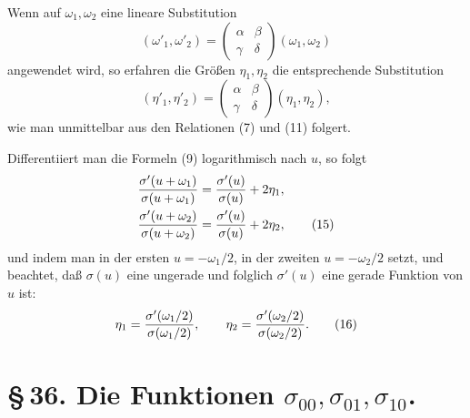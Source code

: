 \documentclass[11pt]{article}
\begin{document}
Wenn auf $\omega_1,
\omega_2$ eine lineare Substitution
\begin{equation}
(\omega'_1,\omega'_2)=
\begin{pmatrix}\alpha&\beta\\ \gamma&\delta\end{pmatrix}(\omega_1,\omega_2) \tag{13}
\end{equation}
angewendet wird, so erfahren die Größen $\eta_1,
\eta_2$ die entsprechende Substitution
\begin{equation}
(\eta'_1,\eta'_2)=
\begin{pmatrix}\alpha&\beta\\ \gamma&\delta\end{pmatrix}(\eta_1,\eta_2), \tag{14}
\end{equation}
wie man unmittelbar aus den Relationen (7) und (11) folgert.

Differentiiert man die Formeln (9) logarithmisch nach $u$, so folgt
\begin{align}
{\sigma'(u+\omega_1)\over\sigma(u+\omega_1)}&={\sigma'(u)\over\sigma(u)}+2\eta_1,\notag\\
{\sigma'(u+\omega_2)\over\sigma(u+\omega_2)}&={\sigma'(u)\over\sigma(u)}+2\eta_2, \tag{15}
\end{align}
und indem man in der ersten $u=-\omega_1/2$, in der zweiten $u=-\omega_2/2$ setzt, und beachtet, daß $\sigma(u)$ eine ungerade und folglich $\sigma'(u)$ eine gerade Funktion von $u$ ist:
\begin{equation}
\eta_1={\sigma'(\omega_1/2)\over\sigma(\omega_1/2)},
\qquad
\eta_2={\sigma'(\omega_2/2)\over\sigma(\omega_2/2)}. \tag{16}
\end{equation}

\section*{\S\,36. Die Funktionen $\sigma_{00},\sigma_{01},\sigma_{10}$.}
\end{document}
